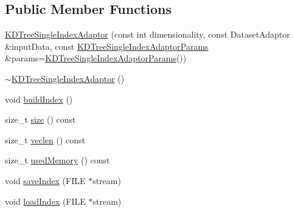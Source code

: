 \subsection*{Public Member Functions}
\begin{DoxyCompactItemize}
\item 
\hyperlink{classnanoflann_1_1_k_d_tree_single_index_adaptor_a501d7ba6b8597ef4d290507d9c9fbd48}{K\-D\-Tree\-Single\-Index\-Adaptor} (const int dimensionality, const Dataset\-Adaptor \&input\-Data, const \hyperlink{structnanoflann_1_1_k_d_tree_single_index_adaptor_params}{K\-D\-Tree\-Single\-Index\-Adaptor\-Params} \&params=\hyperlink{structnanoflann_1_1_k_d_tree_single_index_adaptor_params}{K\-D\-Tree\-Single\-Index\-Adaptor\-Params}())
\item 
\hyperlink{classnanoflann_1_1_k_d_tree_single_index_adaptor_a1b472824808608446cd8f8244c3fede9}{$\sim$\-K\-D\-Tree\-Single\-Index\-Adaptor} ()
\item 
void \hyperlink{classnanoflann_1_1_k_d_tree_single_index_adaptor_ae31b0904cbd1c50d322fea80e296ae8a}{build\-Index} ()
\item 
size\-\_\-t \hyperlink{classnanoflann_1_1_k_d_tree_single_index_adaptor_a197f7417c238e35ad36738c450696155}{size} () const 
\item 
size\-\_\-t \hyperlink{classnanoflann_1_1_k_d_tree_single_index_adaptor_af93772b8cacb6c0da28e28f21c7ed9c3}{veclen} () const 
\item 
size\-\_\-t \hyperlink{classnanoflann_1_1_k_d_tree_single_index_adaptor_a6fd07e3902905741346ef9ca825d42b0}{used\-Memory} () const 
\item 
void \hyperlink{classnanoflann_1_1_k_d_tree_single_index_adaptor_a1eb35794561693abf42b745f30a7339a}{save\-Index} (F\-I\-L\-E $\ast$stream)
\item 
void \hyperlink{classnanoflann_1_1_k_d_tree_single_index_adaptor_ada392af155fafc392ad21dbd82931fec}{load\-Index} (F\-I\-L\-E $\ast$stream)
\end{DoxyCompactItemize}
